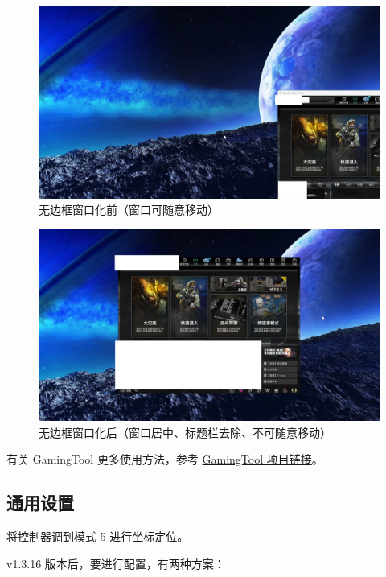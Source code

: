 \begin{figure}
    \Centering
    \includegraphics[width=\textwidth]{docs/assets/before-make-borderless.png}
    \caption{无边框窗口化前（窗口可随意移动）}
    \label{ch2fig-before-make-borderless}
\end{figure}

\begin{figure}
    \Centering
    \includegraphics[width=\textwidth]{docs/assets/after-make-borderless.png}
    \caption{无边框窗口化后（窗口居中、标题栏去除、不可随意移动）}
    \label{ch2fig-after-make-borderless}
\end{figure}

有关 GamingTool 更多使用方法，参考 \href{https://gitee.com/silver1867/gaming-tool}{GamingTool 项目链接}。

\subsection{通用设置}

将控制器调到模式 5 进行坐标定位。

v1.3.16 版本后，要进行配置，有两种方案：

